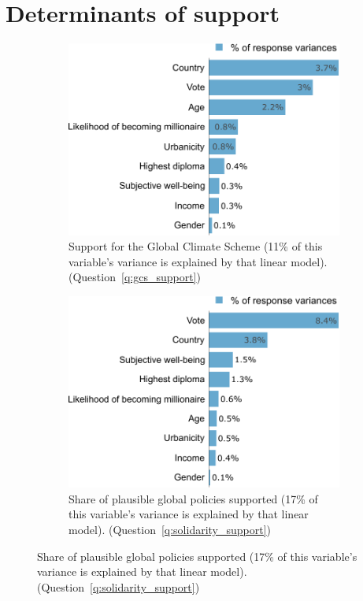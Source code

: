 \section{Determinants of support}\label{app:determinants}


\begin{figure}[h!]\label{fig:lmg}
\caption[Variance decomposition]{Variance decomposition: share of the variance explained by each covariate.}
\begin{subfigure}{.49\textwidth}
  \caption[]{Support for the Global Climate Scheme (11\% of this variable's variance is explained by that linear model). (Question~\ref{q:gcs_support})\label{fig:lmg_gcs}}
  \includegraphics[width=\textwidth]{../figures/all/lmg_gcs_support_few.pdf}
\end{subfigure} \quad
\begin{subfigure}{.49\textwidth}
  \caption[]{Share of plausible global policies supported (17\% of this variable's variance is explained by that linear model). (Question~\ref{q:solidarity_support})\label{fig:lmg_solidarity}}
  \includegraphics[width=\textwidth]{../figures/all/lmg_share_solidarity_supported_few.pdf}
\end{subfigure}
\end{figure}

